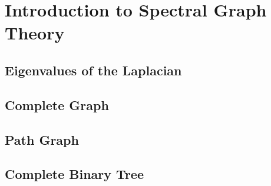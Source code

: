 
\chapter{Introduction to Spectral Graph Theory}

\section{Eigenvalues of the Laplacian}
\section{Complete Graph}
\section{Path Graph}
\section{Complete Binary Tree}